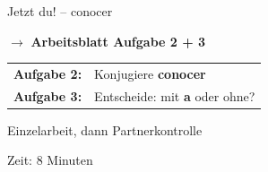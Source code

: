 \documentclass[aspectratio=169, 11pt]{beamer}
\newcommand{\seriftext}[1]{{\fontfamily{ppl}\selectfont #1}}
\newcommand{\es}[1]{\seriftext{\textbf{#1}}}
\newcommand{\abmark}[1]{{\Large$\rightarrow$ \textbf{Arbeitsblatt Aufgabe #1}}}
\begin{document}
\begin{frame}{Jetzt du! -- conocer}
    \vspace{0.8cm}

    \begin{center}
        \abmark{2 + 3}

        \vspace{0.8cm}

        \begin{tabular}{cl}
            \textcolor{akzent}{\textbf{Aufgabe 2:}} & Konjugiere \es{conocer} \\[0.5em]
            \textcolor{akzent}{\textbf{Aufgabe 3:}} & Entscheide: mit \es{a} oder ohne? \\
        \end{tabular}

        \vspace{0.8cm}

        {\large Einzelarbeit, dann Partnerkontrolle}

        \vspace{0.5cm}

        {\small Zeit: 8 Minuten}
    \end{center}
\end{frame}

\end{document}
